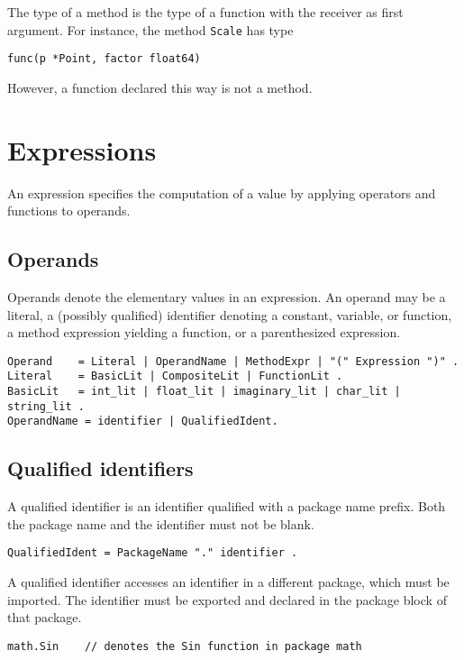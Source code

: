 The type of a method is the type of a function with the receiver as
first argument. For instance, the method \texttt{Scale} has type

\begin{Verbatim}[frame=single]
func(p *Point, factor float64)
\end{Verbatim}

However, a function declared this way is not a method.

\section*{Expressions}

An expression specifies the computation of a value by applying operators
and functions to operands.

\subsection*{Operands}

Operands denote the elementary values in an expression. An operand may
be a literal, a (possibly qualified)
identifier denoting a constant,
variable, or
function, a
method expression yielding a function,
or a parenthesized expression.

\begin{Verbatim}[frame=single]
Operand    = Literal | OperandName | MethodExpr | "(" Expression ")" .
Literal    = BasicLit | CompositeLit | FunctionLit .
BasicLit   = int_lit | float_lit | imaginary_lit | char_lit | string_lit .
OperandName = identifier | QualifiedIdent.
\end{Verbatim}

\subsection*{Qualified identifiers}

A qualified identifier is an identifier qualified with a package name
prefix. Both the package name and the identifier must not be
blank.

\begin{Verbatim}[frame=single]
QualifiedIdent = PackageName "." identifier .
\end{Verbatim}

A qualified identifier accesses an identifier in a different package,
which must be imported. The identifier
must be exported and declared in the
package block of that package.

\begin{Verbatim}[frame=single]
math.Sin    // denotes the Sin function in package math
\end{Verbatim}

